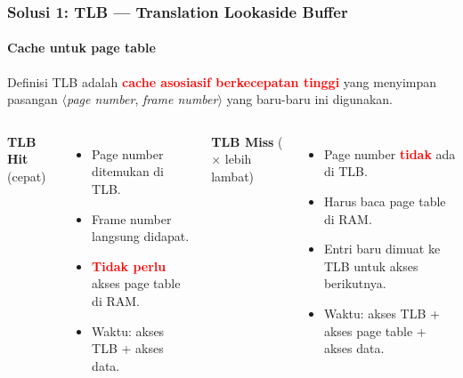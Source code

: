 \documentclass[t,aspectratio=169,xcolor=dvipsnames]{beamer}
\newcommand{\tem}[1]{\textbf{\textcolor{red}{#1}}}
\begin{document}
\begin{frame}
    \frametitle{Solusi 1: TLB — Translation Lookaside Buffer}
    \framesubtitle{Cache untuk page table}
    \footnotesize

    \begin{block}{Definisi}
        TLB adalah \tem{cache asosiasif berkecepatan tinggi} yang menyimpan pasangan
        $\langle$\textit{page number}, \textit{frame number}$\rangle$ yang baru-baru ini digunakan.
    \end{block}

    \vspace{0.15cm}
    \begin{columns}[T]
        \textbf{TLB Hit} (\checkmark cepat)
        \begin{itemize}
            \item Page number ditemukan di TLB.
            \item Frame number langsung didapat.
            \item \tem{Tidak perlu} akses page table di RAM.
            \item Waktu: akses TLB + akses data.
        \end{itemize}

        \textbf{TLB Miss} ($\times$ lebih lambat)
        \begin{itemize}
            \item Page number \tem{tidak} ada di TLB.
            \item Harus baca page table di RAM.
            \item Entri baru dimuat ke TLB untuk akses berikutnya.
            \item Waktu: akses TLB + akses page table + akses data.
        \end{itemize}
    \end{columns}
\end{frame}
\end{document}

